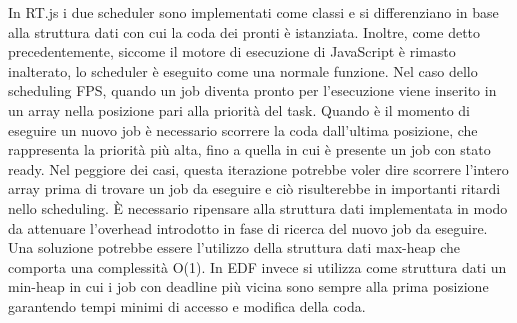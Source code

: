\documentclass[conference]{IEEEtran}
\begin{document}
\newline
In RT.js i due scheduler sono implementati come classi e si differenziano in base alla struttura dati con cui la coda dei pronti è istanziata. Inoltre, come detto precedentemente, siccome il motore di esecuzione di JavaScript è rimasto inalterato, lo scheduler è eseguito come una normale funzione. Nel caso dello scheduling FPS, quando un job diventa pronto per l'esecuzione viene inserito in un array nella posizione pari alla priorità del task. Quando è il momento di eseguire un nuovo job è necessario scorrere la coda dall'ultima posizione, che rappresenta la priorità più alta, fino a quella in cui è presente un job con stato ready. Nel peggiore dei casi, questa iterazione potrebbe voler dire scorrere l'intero array prima di trovare un job da eseguire e ciò risulterebbe in importanti ritardi nello scheduling. È necessario ripensare alla struttura dati implementata in modo da attenuare l'overhead introdotto in fase di ricerca del nuovo job da eseguire. Una soluzione potrebbe essere l'utilizzo della struttura dati max-heap che comporta una complessità O(1). In EDF invece si utilizza come struttura dati un min-heap in cui i job con deadline più vicina sono sempre alla prima posizione garantendo tempi minimi di accesso e modifica della coda.
\end{document}
